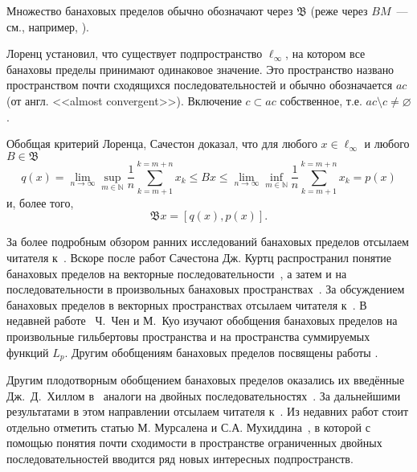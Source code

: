 Множество банаховых пределов обычно обозначают через $\mathfrak{B}$
(реже через $BM$~--- см., например, \cite{alekhno2012superposition,alekhno2015banach}).

Лоренц \cite{lorentz1948contribution} установил, что существует подпространство $\ell_\infty$,
на котором все банаховы пределы принимают одинаковое значение.
Это пространство названо пространством почти сходящихся последовательностей и обычно обозначается $ac$
(от англ. <<almost convergent>>).
Включение $c \subset ac$ собственное, т.е. $ac \setminus c \neq \varnothing$.


Обобщая критерий Лоренца, Сачестон \cite{sucheston1967banach} доказал, что для любого $x\in\ell_\infty$
и любого $B\in\mathfrak{B}$
\begin{equation*}
	q(x) =
	\lim_{n\to\infty} \sup_{m\in\mathbb{N}} \frac{1}{n} \sum_{k=m+1}^{k=m+n} x_k
	\leq
	Bx
	\leq
	\lim_{n\to\infty} \inf_{m\in\mathbb{N}} \frac{1}{n} \sum_{k=m+1}^{k=m+n} x_k
	= p(x)
\end{equation*}
и, более того,
\begin{equation*}
	\mathfrak{B}x = [q(x), p(x)]
	.
\end{equation*}


За более подробным обзором ранних исследований банаховых пределов отсылаем читателя к~\cite{greenleaf1969invariant,day1973normed,kangro1976theory}.
Вскоре после работ Сачестона Дж. Куртц распространил понятие банаховых пределов
на векторные последовательности~\cite{kurtz1970almost},
а затем и на последовательности в произвольных банаховых пространствах~\cite{kurtz1972almost}.
За обсуждением банаховых пределов в векторных пространствах отсылаем читателя
к~\cite{deeds1968summability,hajdukovic1975almost,armario2013vector,garcia2015extremal,garcia2016fundamental}.
В недавней работе~\cite{chen2007characterizations} Ч.~Чен и М.~Куо изучают обобщения банаховых пределов
на произвольные гильбертовы пространства и на пространства суммируемых функций $L_p$.
Другим обобщениям банаховых пределов посвящены работы
\cite{hajdukovic1975functionals,koga2016generalization}.

Другим плодотворным обобщением банаховых пределов оказались их введённые Дж.~Д.~Хиллом в~\cite{hill1965almost} аналоги на двойных последовательностях~\cite{robison1926divergent}.
За дальнейшими результатами в этом направлении отсылаем читателя
к~\cite{moricz1988almost,bacsarir1995strong,mursaleen2003almost,edely2004almost,mursaleen2004almost}.
Из недавних работ стоит отдельно отметить статью М. Мурсалена и С.А. Мухиддина~\cite{mursaleen2012banach},
в которой с помощью понятия почти сходимости в пространстве ограниченных двойных последовательностей вводится ряд новых интересных подпространств.

